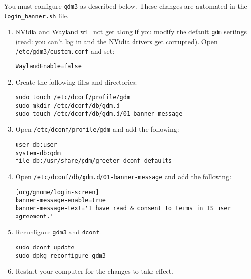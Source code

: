 You must configure \texttt{gdm3} as described below. These changes are automated in the \texttt{login\_banner.sh} file.

\begin{enumerate}
\item NVidia and Wayland will not get along if you modify the default \texttt{gdm} settings (read: you can't log in and the NVidia drivers get corrupted). Open \texttt{/etc/gdm3/custom.conf} and set:

\texttt{WaylandEnable=false}

\item Create the following files and directories:
\begin{verbatim}
sudo touch /etc/dconf/profile/gdm
sudo mkdir /etc/dconf/db/gdm.d
sudo touch /etc/dconf/db/gdm.d/01-banner-message
\end{verbatim}

\item Open \texttt{/etc/dconf/profile/gdm} and add the following:
\begin{verbatim}
user-db:user
system-db:gdm
file-db:/usr/share/gdm/greeter-dconf-defaults
\end{verbatim}

\item Open \texttt{/etc/dconf/db/gdm.d/01-banner-message} and add the following:
\begin{verbatim}
[org/gnome/login-screen]
banner-message-enable=true
banner-message-text='I have read & consent to terms in IS user agreement.'
\end{verbatim}

\item Reconfigure \texttt{gdm3} and \texttt{dconf}.
\begin{verbatim}
sudo dconf update
sudo dpkg-reconfigure gdm3
\end{verbatim}

\item Restart your computer for the changes to take effect.
\end{enumerate}

